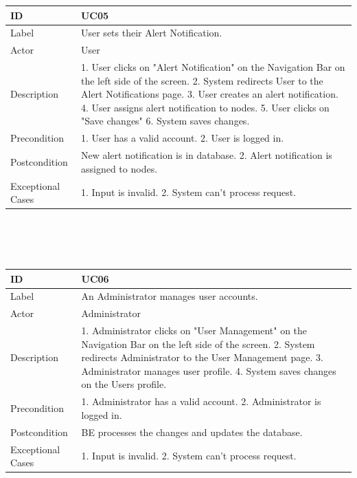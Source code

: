 \documentclass{scrreprt}
\begin{document}
\begin{tabularx}{12cm}{l|X}
ID & UC05  \\
\hline
Label & 
User sets their Alert Notification. \\
\hline
Actor            & User  \\
\hline
Description            &  	1. User clicks on "Alert Notification" on the Navigation Bar on the left side of the screen. 2. System redirects User to the Alert Notifications page. 3. User creates an alert notification. 4. User assigns alert notification to nodes. 5. User clicks on "Save changes" 6. System saves changes.   
\\
\hline
Precondition           & 1. User has a valid account. 2. User is logged in.   \\
\hline
Postcondition     &  New alert notification is in database. 2. Alert notification is assigned to nodes. \\
\hline
Exceptional Cases & 1. Input is invalid. 2. System can't process request.
\end{tabularx}
\\
\\ \\ 
\begin{tabularx}{12cm}{l|X}
ID & UC06  \\
\hline
Label & 
An Administrator manages user accounts. \\
\hline
Actor            & Administrator   \\
\hline
Description            &  	1. Administrator clicks on "User Management" on the Navigation Bar on the left side of the screen. 2. System redirects Administrator to the User Management page. 3. Administrator manages user profile. 4. System saves changes on the Users profile.   
\\
\hline
Precondition           & 1. Administrator has a valid account. 2. Administrator is logged in.  \\
\hline
Postcondition     & BE processes the changes and updates the database. \\
\hline
Exceptional Cases & 1. Input is invalid. 2. System can't process request.
\end{tabularx}
\\
\\ \\
\end{document}
